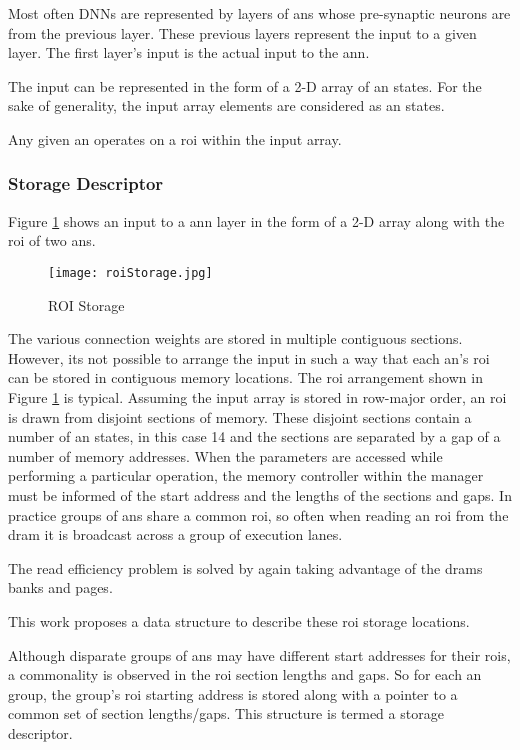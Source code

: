 Most often DNNs are represented by layers of \acp{an} whose pre-synaptic neurons are from the previous layer. These previous layers represent the input to a given layer. The first layer's input is the actual input to the \ac{ann}.

The input can be represented in the form of a 2-D array of \ac{an} states. For the sake of generality, the input array elements are considered as \ac{an} states.

Any given \ac{an} operates on a \ac{roi} within the input array.

\subsubsection{Storage Descriptor}
\label{sec:Storage Descriptor}

Figure \ref{fig:roiStorage} shows an input to a \ac{ann} layer in the form of a 2-D array along with the \ac{roi} of two \acp{an}.

\begin{figure}[!t]
\centering
\captionsetup{justification=centering}
\captionsetup{width=.9\linewidth}
\centerline{
\mbox{\texttt{[image: roiStorage.jpg]}}
}
\caption{ROI Storage}
\label{fig:roiStorage}
\end{figure}

The various connection weights are stored in multiple contiguous sections. However, its not possible to arrange the input in such a way that each \ac{an}'s \ac{roi} can be stored in contiguous memory locations. 
The \ac{roi} arrangement shown in Figure \ref{fig:roiStorage} is typical. Assuming the input array is stored in row-major order, an \ac{roi} is drawn from disjoint sections of memory. 
These disjoint sections contain a number of \ac{an} states, in this case 14 and the sections are separated by a gap of a number of memory addresses. 
When the parameters are accessed while performing a particular operation, the memory controller within the manager must be informed of the start address and the lengths of the sections and gaps. 
In practice groups of \acp{an} share a common \ac{roi}, so often when reading an \ac{roi} from the \ac{dram} it is broadcast across a group of execution lanes.

The read efficiency problem is solved by again taking advantage of the \ac{dram}s banks and pages.

This work proposes a data structure to describe these \ac{roi} storage locations.

Although disparate groups of \acp{an} may have different start addresses for their \acp{roi}, a commonality is observed in the \ac{roi} section lengths and gaps. So for each \ac{an} group, the group's \ac{roi} starting address is stored along with a pointer to a common set of section lengths/gaps. This structure is termed a storage descriptor.

